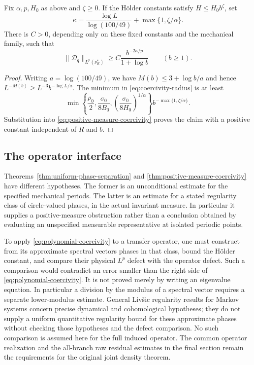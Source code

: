\begin{corollary}
\label{cor:polynomial-regularity-budget}
Fix $\alpha,p,H_0$ as above and $\zeta\ge0$. If the H\"older constants
satisfy $H\le H_0b^\zeta$, set
\begin{equation}\label{eq:coercivity-exponent}
 \kappa=\frac{\log L}{\log(100/49)}+
                       \max\{1,\zeta/\alpha\}.
\end{equation}
There is $C>0$, depending only on these fixed constants and the
mechanical family, such that
\begin{equation}\label{eq:polynomial-coercivity}
 \|\mathcal D_q\|_{L^p(\nu_R^*)}
             \ge C\frac{b^{-2\kappa/p}}{1+\log b}\qquad(b\ge1).
\end{equation}
\end{corollary}
\begin{proof}
Writing $a=\log(100/49)$, we have $M(b)\le3+\log b/a$ and hence
$L^{-M(b)}\ge L^{-3}b^{-\log L/a}$. The minimum in
\eqref{eq:coercivity-radius} is at least
\[
 \min\left\{\frac{\rho_0}{2},\frac{\sigma_0}{8B_0},
           \left(\frac{\sigma_0}{8H_0}\right)^{1/\alpha}\right\}
                     b^{-\max\{1,\zeta/\alpha\}}.
\]
Substitution into \eqref{eq:positive-measure-coercivity} proves the
claim with a positive constant independent of $R$ and $b$.
\end{proof}

\subsection{The operator interface}
Theorems~\ref{thm:uniform-phase-separation} and
\ref{thm:positive-measure-coercivity} have different hypotheses.
The former is an unconditional estimate for the specified mechanical
periods. The latter is an estimate for a stated regularity class of
circle-valued phases, in the actual invariant measure. In particular
it supplies a positive-measure obstruction rather than a conclusion
obtained by evaluating an unspecified measurable representative at
isolated periodic points.

To apply \eqref{eq:polynomial-coercivity} to a transfer operator,
one must construct from its approximate spectral vectors phases in
that class, bound the H\"older constant, and compare their physical
$L^p$ defect with the operator defect. Such a comparison would
contradict an error smaller than the right side of
\eqref{eq:polynomial-coercivity}. It is not proved merely by writing
an eigenvalue equation. In particular a division by the modulus of a
spectral vector requires a separate lower-modulus estimate.
General Liv\v{s}ic regularity results for Markov systems
\cite{BHN} concern precise dynamical and cohomological hypotheses;
they do not supply a uniform quantitative regularity bound for these
approximate phases without checking those hypotheses and the defect
comparison. No such comparison is assumed here for the full induced
operator. The common operator realization and the all-branch raw
residual estimates in the final section remain the requirements for
the original joint density theorem.
